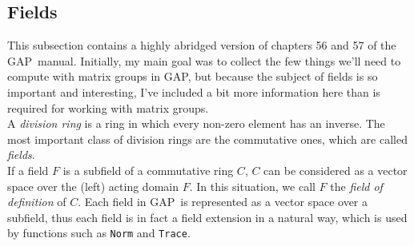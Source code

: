 \documentclass[11pt]{amsart}
\newcommand{\gap}{GAP}   %
\theoremstyle{plain}
\newcommand{\<}{\ensuremath{\langle}}
\renewcommand{\>}{\ensuremath{\rangle}}
\begin{document}
\subsection{Fields}
This subsection contains a highly abridged version of chapters 56 and 57 of the \gap\
manual.  Initially, my main goal was to collect the few things we'll need to compute
with matrix groups in \gap, but because the subject of fields is so important and
interesting, I've included a bit more information here than is required for working
with matrix groups.
\\[4pt]
A \emph{division ring} is a ring in which every non-zero element has an inverse. The most
important class of division rings are the commutative ones, which are called \emph{fields}.
\\[4pt]
If a field $F$ is a subfield of a commutative ring $C$, $C$ can be considered as a
vector space over the (left) acting domain $F$. In this situation, we call $F$ the
\emph{field of definition} of $C$. Each field in \gap\ is represented as a vector
space over a subfield, thus each field is in fact a field extension in a natural way,
which is used by functions such as {\tt Norm} and {\tt Trace}.
\end{document}
